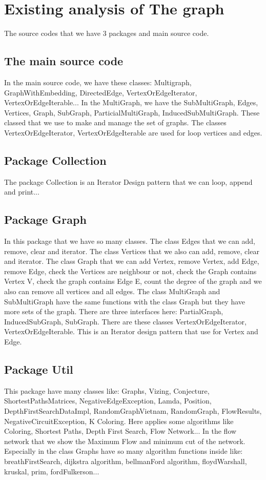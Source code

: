 \documentclass[a4paper,10pt]{article}
\begin{document}
\section{Existing analysis of The graph}
The source codes that we have 3 packages and main source code.
\subsection{The main source code}
In the main source code, we have these classes: Multigraph, GraphWithEmbedding, DirectedEdge, VertexOrEdgeIterator, VertexOrEdgeIterable...
In the MultiGraph, we have the SubMultiGraph, Edges, Vertices, Graph, SubGraph, ParticialMultiGraph, InducedSubMultiGraph. These classed that we use to make and manage the set of graphs.
The classes VertexOrEdgeIterator, VertexOrEdgeIterable are used for loop vertices and edges.
\subsection{Package Collection}
The package Collection is an Iterator Design pattern that we can loop, append and print...
\subsection{Package Graph}
In this package that we have so many classes.
The class Edges that we can add, remove, clear and iterator.
The class Vertices that we also can add, remove, clear and iterator.
The class Graph that we can add Vertex, remove Vertex, add Edge, remove Edge, check the Vertices are neighbour or not, check the Graph contains Vertex V, check the graph contains Edge E, count the degree of the graph and we also can remove all vertices and all edges.
The class MultiGraph and SubMultiGraph have the same functions with the class Graph but they have more sets of the graph.
There are three interfaces here: PartialGraph, InducedSubGraph, SubGraph.
There are these classes VertexOrEdgeIterator, VertexOrEdgeIterable. This is an Iterator design pattern that use for Vertex and Edge.
\subsection{Package Util}
This package have many classes like: Graphs, Vizing, Conjecture, ShortestPathsMatrices, NegativeEdgeException, Lamda, Position, DepthFirstSearchDataImpl, RandomGraphVietnam, RandomGraph, FlowResults, NegativeCircuitException, K Coloring.
Here applies some algorithms like Coloring, Shortest Paths, Depth First Search, Flow Network...
In the flow network that we show the Maximum Flow and minimum cut of the network.
Especially in the class Graphs have so many algorithm functions inside like: breathFirstSearch, dijkstra algorithm, bellmanFord algorithm, floydWarshall, kruskal, prim, fordFulkerson...
%
\end{document}
